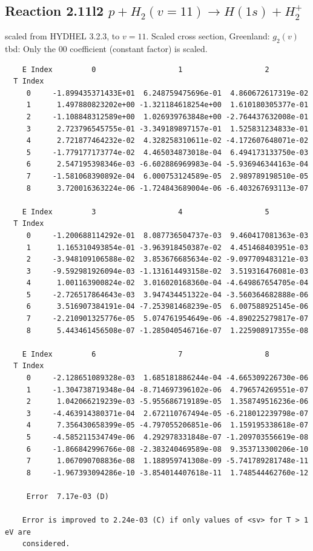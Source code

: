 \documentclass[12pt,dvipdfmx]{article}
\begin{document}
\subsection{
Reaction 2.11l2 $   p + H_2(v=11) \rightarrow H(1s) + H_2^+$}
scaled from HYDHEL 3.2.3, to $v=11$. Scaled cross section, Greenland: $g_2(v)$
tbd:
Only the 00 coefficient (constant factor) is scaled.


\begin{small}\begin{verbatim}
    E Index         0                   1                   2
  T Index
     0     -1.899435371433E+01  6.248759475696e-01  4.860672617319e-02
     1      1.497880823202e+00 -1.321184618254e+00  1.610180305377e-01
     2     -1.108848312589e+00  1.026939763848e+00 -2.764437632008e-01
     3      2.723796545755e-01 -3.349189897157e-01  1.525831234833e-01
     4      2.721877464232e-02  4.328258310611e-02 -4.172607648071e-02
     5     -1.779177173774e-02  4.465034873018e-04  6.494173133750e-03
     6      2.547195398346e-03 -6.602886969983e-04 -5.936946344163e-04
     7     -1.581068390892e-04  6.000753124589e-05  2.989789198510e-05
     8      3.720016363224e-06 -1.724843689004e-06 -6.403267693113e-07

    E Index         3                   4                   5
  T Index
     0     -1.200688114292e-01  8.087736504737e-03  9.460417081363e-03
     1      1.165310493854e-01 -3.963918450387e-02  4.451468403951e-03
     2     -3.948109106588e-02  3.853676685634e-02 -9.097709483121e-03
     3     -9.592981926094e-03 -1.131614493158e-02  3.519316476081e-03
     4      1.001163900824e-02  3.016020168360e-04 -4.649867654705e-04
     5     -2.726517864643e-03  3.947434451322e-04 -3.560364682888e-06
     6      3.516907384191e-04 -7.253981468239e-05  6.007588925145e-06
     7     -2.210901325776e-05  5.074761954649e-06 -4.890225279817e-07
     8      5.443461456508e-07 -1.285040546716e-07  1.225908917355e-08

    E Index         6                   7                   8
  T Index
     0     -2.128651089328e-03  1.685181886244e-04 -4.665309226730e-06
     1     -1.304738719348e-04 -8.714697396102e-06  4.796574269551e-07
     2      1.042066219239e-03 -5.955686719189e-05  1.358749516236e-06
     3     -4.463914380371e-04  2.672110767494e-05 -6.218012239798e-07
     4      7.356430658399e-05 -4.797055206851e-06  1.159195338618e-07
     5     -4.585211534749e-06  4.292978331848e-07 -1.209703556619e-08
     6     -1.866842996766e-08 -2.383240469589e-08  9.353713300206e-10
     7      1.067090708836e-08  1.188959741308e-09 -5.741789281748e-11
     8     -1.967393094286e-10 -3.854014407618e-11  1.748544462760e-12

     Error  7.17e-03 (D)

    Error is improved to 2.24e-03 (C) if only values of <sv> for T > 1 eV are
    considered.
\end{verbatim}\end{small}
\newpage
\end{document}
